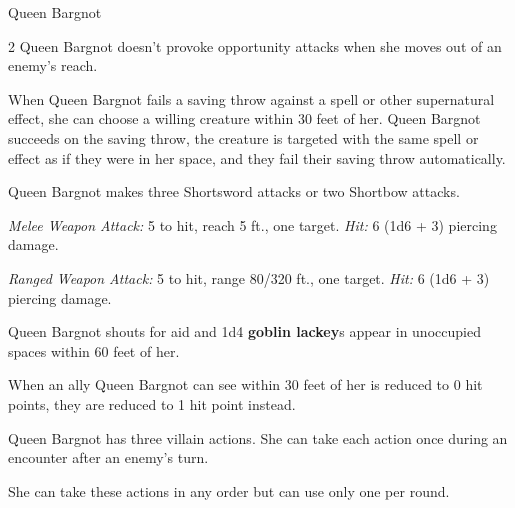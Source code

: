 \documentclass[10pt,a4paper,twoside,bg=print,twocolumn,openany,nodeprecatedcode]{dndbook}
\begin{document}
\begin{DndMonster}[float*=b,width=\textwidth + 8pt]{Queen Bargnot}
\begin{multicols}{2}
\DndMonsterBasics[
armor-class = {17 (studded leather armor)},
hit-points = {\DndDice{12d6 + 12}},
speed = {30 ft., climb 20 ft.}
]
\DndMonsterAbilityScores[
 str = 10,
 dex = 17,
 con = 13,
 int = 14,
 wis = 12,
 cha = 13
]
\DndMonsterDetails[
saving-throws = {Dex +5, Wis +3},
skills = {Insight +3, Intimidation +3, Perception +3, Stealth +5},
senses = {darkvision 60 ft., passive perception 13},
languages = {Common, Goblin},
challenge = 3,
]
Queen Bargnot doesn't provoke opportunity attacks when she moves out of an enemy's reach.

When Queen Bargnot fails a saving throw against a spell or other supernatural effect, she can choose a willing creature within 30 feet of her. Queen Bargnot succeeds on the saving throw, the creature is targeted with the same spell or effect as if they were in her space, and they fail their saving throw automatically.

Queen Bargnot makes three Shortsword attacks or two Shortbow attacks.

\textsl{Melee Weapon Attack:} 5 to hit, reach 5 ft., one target. \textsl{Hit:} 6 (1d6 + 3) piercing damage.

\textsl{Ranged Weapon Attack:} 5 to hit, range 80/320 ft., one target. \textsl{Hit:} 6 (1d6 + 3) piercing damage.

Queen Bargnot shouts for aid and 1d4 \textbf{goblin lackey}s appear in unoccupied spaces within 60 feet of her.

When an ally Queen Bargnot can see within 30 feet of her is reduced to 0 hit points, they are reduced to 1 hit point instead.

Queen Bargnot has three villain actions. She can take each action once during an encounter after an enemy's turn.

She can take these actions in any order but can use only one per round.


\end{multicols}
\end{DndMonster}
\end{document}
